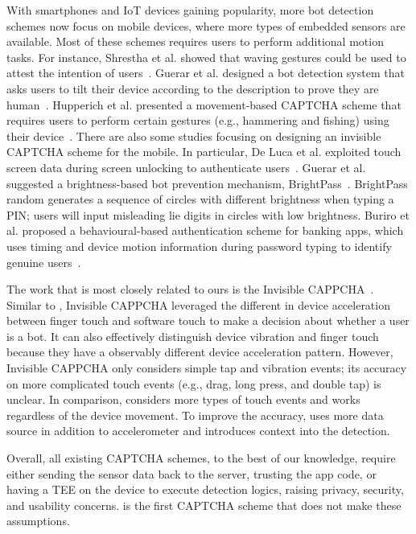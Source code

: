 With smartphones and IoT devices gaining popularity, more bot detection schemes now focus on mobile devices, where more types of embedded sensors are available. Most of these schemes requires users to perform additional motion tasks. For instance, Shrestha et al. showed that waving gestures could be used to attest the intention of users~\cite{10.1007/978-3-319-02937-5_11}. Guerar et al. designed a bot detection system that asks users to tilt their device according to the description to prove they are human~\cite{guerar2018completely}. Hupperich et al. presented a movement-based CAPTCHA scheme that requires users to perform certain gestures (e.g., hammering and fishing) using their device~\cite{10.1007/978-3-319-45572-3_3}. There are also some studies focusing on designing an invisible CAPTCHA scheme for the mobile. In particular, De Luca et al. exploited touch screen data during screen unlocking to authenticate users~\cite{DeLuca:2012:TMO:2207676.2208544}. Guerar et al. suggested a brightness-based bot prevention mechanism, BrightPass~\cite{guerar2016using}. BrightPass random generates a sequence of circles with different brightness when typing a PIN; users will input misleading lie digits in circles with low brightness. Buriro et al. proposed a behavioural-based authentication scheme for banking apps, which uses timing and device motion information during password typing to identify genuine users~\cite{buriro2017evaluation}. 

The work that is most closely related to ours is the Invisible CAPPCHA~\cite{Guerar2018}. Similar to \name, Invisible CAPPCHA leveraged the different in device acceleration between finger touch and software touch to make a decision about whether a user is a bot. It can also effectively distinguish device vibration and finger touch because they have a observably different device acceleration pattern. However, Invisible CAPPCHA only considers simple tap and vibration events; its accuracy on more complicated touch events (e.g., drag, long press, and double tap) is unclear. In comparison, \name considers more types of touch events and works regardless of the device movement. To improve the accuracy, \name uses more data source in addition to accelerometer and introduces context into the detection.

Overall, all existing CAPTCHA schemes, to the best of our knowledge, require either sending the sensor data back to the server, trusting the app code, or having a TEE on the device to execute detection logics, raising privacy, security, and usability concerns. \name is the first CAPTCHA scheme that does not make these assumptions.